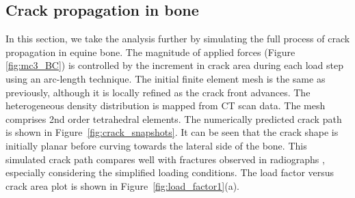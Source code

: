 \documentclass[onecolumn]{svjour3}
\begin{document}
\subsection{Crack propagation in bone}
In this section, we take the analysis further by simulating the full process of crack propagation in equine bone. 
The magnitude of applied forces (Figure \ref{fig:mc3_BC}) is controlled by the increment in crack area during each load step using an arc-length technique. 
The initial finite element mesh is the same as previously, although it is locally refined as the crack front advances. 
The heterogeneous density distribution is mapped from CT scan data. 
The mesh comprises 2nd order tetrahedral elements.
The numerically predicted crack path is shown in Figure~\ref{fig:crack_snapshots}. 
It can be seen that the crack shape is initially planar before curving towards the lateral side of the bone. This simulated crack path compares well with fractures observed in radiographs \cite{whitton2010third}, especially considering the simplified loading conditions. 
The load factor versus crack area plot is shown in Figure~\ref{fig:load_factor1}(a). 
% 
\end{document}
